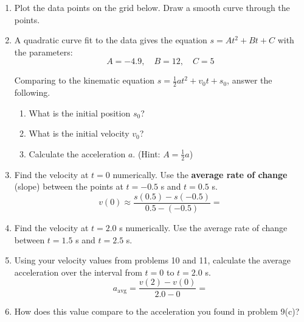 \documentclass[12pt, twoside]{article}
\begin{document}
\begin{enumerate}[itemsep=0.5cm]
\item Plot the data points on the grid below. Draw a smooth curve through the points.

\begin{center}
\end{center}

\newpage
\item A quadratic curve fit to the data gives the equation $s = At^2 + Bt + C$ with the parameters:
$$A = -4.9, \quad B = 12, \quad C = 5$$

Comparing to the kinematic equation $s = \tfrac{1}{2}at^2 + v_0 t + s_0$, answer the following.

  \begin{enumerate}[itemsep=1.0cm]
    \item What is the initial position $s_0$?
    \item What is the initial velocity $v_0$?
    \item Calculate the acceleration $a$. (Hint: $A = \frac{1}{2}a$)
  \end{enumerate}
  \vspace{1.5cm}

\item Find the velocity at $t = 0$ numerically. Use the \textbf{average rate of change} (slope) between the points at $t = -0.5$ s and $t = 0.5$ s.
$$v(0) \approx \frac{s(0.5) - s(-0.5)}{0.5 - (-0.5)} = $$
  \vspace{2.cm}

\item Find the velocity at $t = 2.0$ s numerically. Use the average rate of change between $t = 1.5$ s and $t = 2.5$ s.
  \vspace{1.5cm}

\item Using your velocity values from problems 10 and 11, calculate the average acceleration over the interval from $t = 0$ to $t = 2.0$ s.
$$a_\text{avg} = \frac{v(2) - v(0)}{2.0 - 0} = $$
  \vspace{1cm}

\item How does this value compare to the acceleration you found in problem 9(c)?

\end{enumerate}
\end{document}
